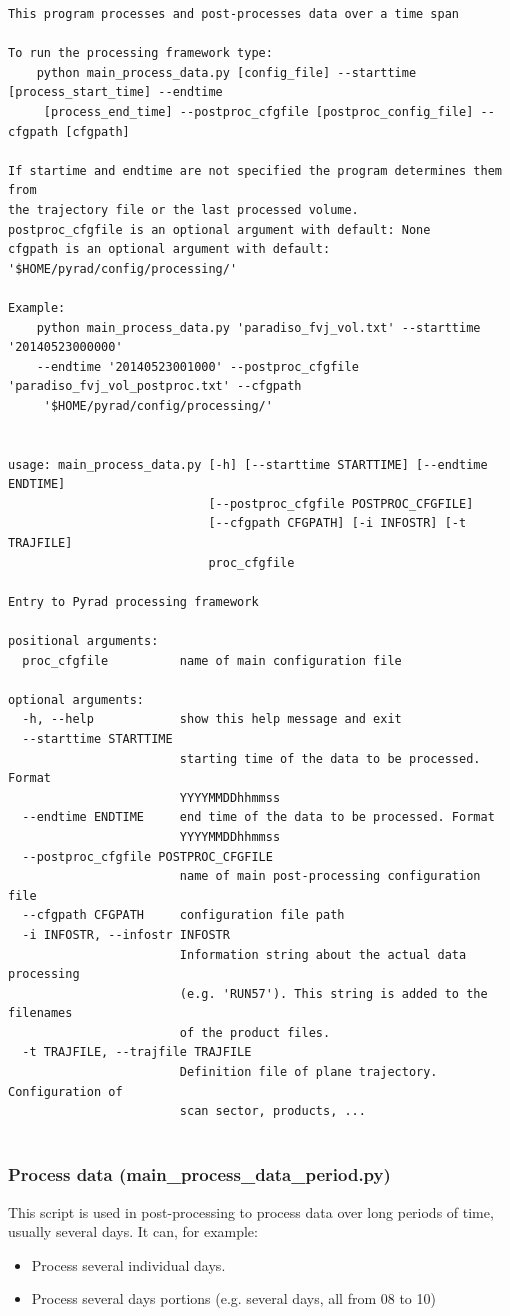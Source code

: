 \documentclass[a4paper,11pt,pdftex,twoside]{scrartcl}
\begin{document}
\begin{verbatim}
This program processes and post-processes data over a time span

To run the processing framework type:
    python main_process_data.py [config_file] --starttime [process_start_time] --endtime
     [process_end_time] --postproc_cfgfile [postproc_config_file] --cfgpath [cfgpath]

If startime and endtime are not specified the program determines them from
the trajectory file or the last processed volume.
postproc_cfgfile is an optional argument with default: None
cfgpath is an optional argument with default: '$HOME/pyrad/config/processing/'

Example:
    python main_process_data.py 'paradiso_fvj_vol.txt' --starttime '20140523000000'
    --endtime '20140523001000' --postproc_cfgfile 'paradiso_fvj_vol_postproc.txt' --cfgpath
     '$HOME/pyrad/config/processing/'


usage: main_process_data.py [-h] [--starttime STARTTIME] [--endtime ENDTIME]
                            [--postproc_cfgfile POSTPROC_CFGFILE]
                            [--cfgpath CFGPATH] [-i INFOSTR] [-t TRAJFILE]
                            proc_cfgfile

Entry to Pyrad processing framework

positional arguments:
  proc_cfgfile          name of main configuration file

optional arguments:
  -h, --help            show this help message and exit
  --starttime STARTTIME
                        starting time of the data to be processed. Format
                        YYYYMMDDhhmmss
  --endtime ENDTIME     end time of the data to be processed. Format
                        YYYYMMDDhhmmss
  --postproc_cfgfile POSTPROC_CFGFILE
                        name of main post-processing configuration file
  --cfgpath CFGPATH     configuration file path
  -i INFOSTR, --infostr INFOSTR
                        Information string about the actual data processing
                        (e.g. 'RUN57'). This string is added to the filenames
                        of the product files.
  -t TRAJFILE, --trajfile TRAJFILE
                        Definition file of plane trajectory. Configuration of
                        scan sector, products, ...


\end{verbatim}

\subsubsection{Process data (main\_process\_data\_period.py)}
This script is used in post-processing to process data over long periods of time, usually several days.
It can, for example:
\begin{itemize}
   \item Process several individual days.
   \item Process several days portions (e.g. several days, all from 08 to 10)
\end{itemize}
\end{document}
